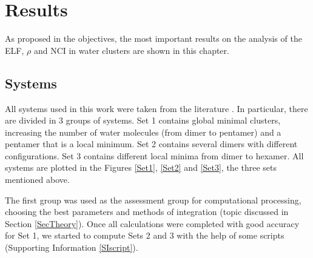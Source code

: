 \chapter{Results}

As proposed in the objectives, the most important results on the analysis of
the ELF, $\rho$ and NCI in water clusters are shown in this chapter.

\section{Systems}

All systems used in this work were taken from the literature
\cite{Temelso2011}. In particular, there are divided in 3 groups of systems.
Set 1 contains global minimal clusters, increasing the number of water
molecules (from dimer to pentamer) and a pentamer that is a local minimum. Set
2 contains several dimers with different configurations. Set 3 contains
different local minima from dimer to hexamer. All systems are plotted in the
Figures \ref{Set1}, \ref{Set2} and \ref{Set3}, the three sets mentioned above.

The first group was used as the assessment group for computational processing,
choosing the best parameters and methods of integration (topic discussed in
Section \ref{SecTheory}). Once all calculations were completed with good
accuracy for Set 1, we started to compute Sets 2 and 3 with the help of some
scripts (Supporting Information \ref{SIscript}).

\newpage

